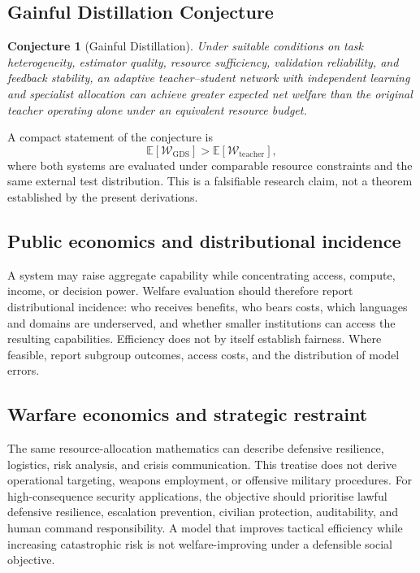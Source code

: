 \documentclass[11pt,a4paper]{article}
\newtheorem{conjecture}[definition]{Conjecture}
\begin{document}
\subsection{Gainful Distillation Conjecture}

\begin{conjecture}[Gainful Distillation]
Under suitable conditions on task heterogeneity, estimator quality, resource sufficiency, validation reliability, and feedback stability, an adaptive teacher--student network with independent learning and specialist allocation can achieve greater expected net welfare than the original teacher operating alone under an equivalent resource budget.
\end{conjecture}

A compact statement of the conjecture is
\begin{equation}
\mathbb E[\mathcal W_{\mathrm{GDS}}]
>
\mathbb E[\mathcal W_{\mathrm{teacher}}],
\end{equation}
where both systems are evaluated under comparable resource constraints and the same external test distribution. This is a falsifiable research claim, not a theorem established by the present derivations.

\subsection{Public economics and distributional incidence}

A system may raise aggregate capability while concentrating access, compute, income, or decision power. Welfare evaluation should therefore report distributional incidence: who receives benefits, who bears costs, which languages and domains are underserved, and whether smaller institutions can access the resulting capabilities. Efficiency does not by itself establish fairness. Where feasible, report subgroup outcomes, access costs, and the distribution of model errors.

\subsection{Warfare economics and strategic restraint}

The same resource-allocation mathematics can describe defensive resilience, logistics, risk analysis, and crisis communication. This treatise does not derive operational targeting, weapons employment, or offensive military procedures. For high-consequence security applications, the objective should prioritise lawful defensive resilience, escalation prevention, civilian protection, auditability, and human command responsibility. A model that improves tactical efficiency while increasing catastrophic risk is not welfare-improving under a defensible social objective.
\end{document}
